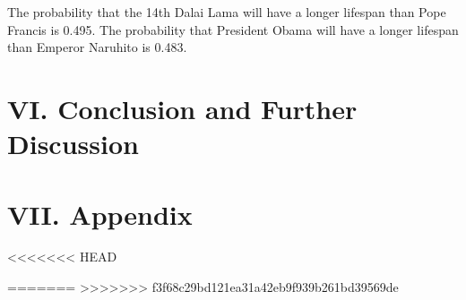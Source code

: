 \documentclass[]{article}
\begin{document}
The probability that the 14th Dalai Lama will have a longer lifespan
than Pope Francis is 0.495. The probability that President Obama will
have a longer lifespan than Emperor Naruhito is 0.483.

\hypertarget{vi.-conclusion-and-further-discussion}{%
\section{VI. Conclusion and Further
Discussion}\label{vi.-conclusion-and-further-discussion}}

\hypertarget{vii.-appendix}{%
\section{VII. Appendix}\label{vii.-appendix}}

<<<<<<< HEAD

=======
>>>>>>> f3f68c29bd121ea31a42eb9f939b261bd39569de
\end{document}
